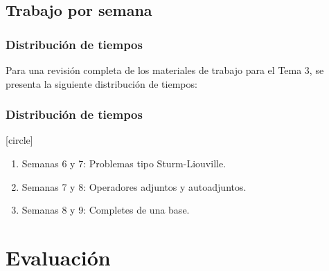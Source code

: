 \documentclass[12pt]{beamer}
\begin{document}
\subsection{Trabajo por semana}

\begin{frame}
\frametitle{Distribución de tiempos}
Para una revisión completa de los materiales de trabajo para el Tema 3, se presenta la siguiente distribución de tiempos:
\end{frame}
\begin{frame}
\frametitle{Distribución de tiempos}
[circle]
\begin{enumerate}
\item Semanas 6 y 7: Problemas tipo Sturm-Liouville.
\item Semanas 7 y 8: Operadores adjuntos y autoadjuntos.
\item Semanas 8 y 9: Completes de una base.
\end{enumerate}
\end{frame}



\section{Evaluación}
\end{document}
